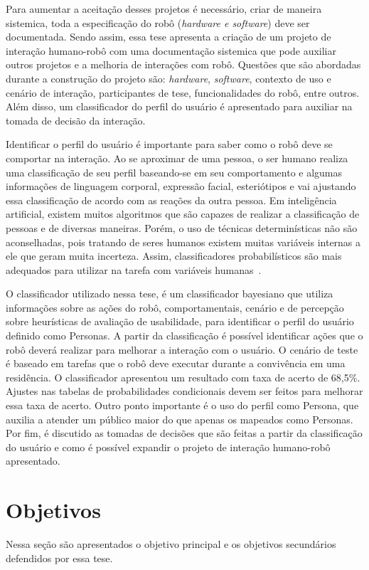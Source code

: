 Para aumentar a aceitação desses projetos é necessário, criar de maneira sistemica, toda a especificação do robô (\emph{hardware e software}) deve ser documentada. Sendo assim, essa tese apresenta a criação de um projeto de interação humano-robô com uma documentação sistemica que pode auxiliar outros projetos e a melhoria de interações com robô. Questões que são abordadas durante a construção do projeto são: \emph{hardware}, \emph{software}, contexto de uso e cenário de interação, participantes de tese, funcionalidades do robô, entre outros. Além disso, um classificador do perfil do usuário é apresentado para auxiliar na tomada de decisão da interação.

Identificar o perfil do usuário é importante para saber como o robô deve se comportar na interação. Ao se aproximar de uma pessoa, o ser humano realiza uma classificação de seu perfil baseando-se em seu comportamento e algumas informações de linguagem corporal, expressão facial, esteriótipos e vai ajustando essa classificação de acordo com as reações da outra pessoa. Em inteligência artificial, existem muitos algoritmos que são capazes de realizar a classificação de pessoas e de diversas maneiras. Porém, o uso de técnicas determinísticas não são aconselhadas, pois tratando de seres humanos existem muitas variáveis internas a ele que geram muita incerteza. Assim, classificadores probabilísticos são mais adequados para utilizar na tarefa com variáveis humanas~\cite{faceli:2011, hartson:2012}.

O classificador utilizado nessa tese, é um classificador bayesiano que utiliza informações sobre as ações do robô, comportamentais, cenário e de percepção sobre heurísticas de avaliação de usabilidade, para identificar o perfil do usuário definido como Personas. A partir da classificação é possível identificar ações que o robô deverá realizar para melhorar a interação com o usuário.  O cenário de teste é baseado em tarefas que o robô deve executar durante a convivência em uma residência. O classificador apresentou um resultado com taxa de acerto de 68,5\%. Ajustes nas tabelas de probabilidades condicionais devem ser feitos para melhorar essa taxa de acerto. Outro ponto importante é o uso do perfil como Persona, que auxilia a atender um público maior do que apenas os mapeados como Personas. Por fim, é discutido as tomadas de decisões que são feitas a partir da classificação do usuário e como é possível expandir o projeto de interação humano-robô apresentado.

\section{Objetivos}
Nessa seção são apresentados o objetivo principal e os objetivos secundários defendidos por essa tese.

